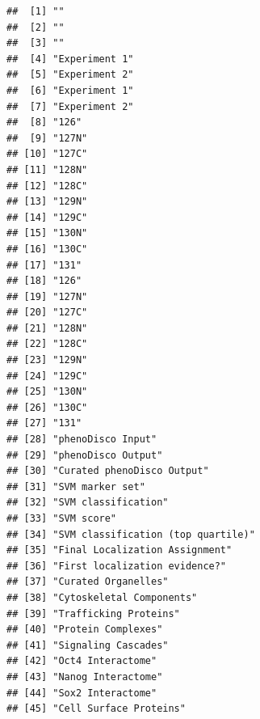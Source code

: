 \begin{knitrout}
\color{fgcolor}\begin{kframe}
\begin{alltt}
  \hlstd{=} \hlstd{,}  \hlstd{=} \hlstd{)}
\end{alltt}
\begin{verbatim}
##  [1] ""                                 
##  [2] ""                                 
##  [3] ""                                 
##  [4] "Experiment 1"                     
##  [5] "Experiment 2"                     
##  [6] "Experiment 1"                     
##  [7] "Experiment 2"                     
##  [8] "126"                              
##  [9] "127N"                             
## [10] "127C"                             
## [11] "128N"                             
## [12] "128C"                             
## [13] "129N"                             
## [14] "129C"                             
## [15] "130N"                             
## [16] "130C"                             
## [17] "131"                              
## [18] "126"                              
## [19] "127N"                             
## [20] "127C"                             
## [21] "128N"                             
## [22] "128C"                             
## [23] "129N"                             
## [24] "129C"                             
## [25] "130N"                             
## [26] "130C"                             
## [27] "131"                              
## [28] "phenoDisco Input"                 
## [29] "phenoDisco Output"                
## [30] "Curated phenoDisco Output"        
## [31] "SVM marker set"                   
## [32] "SVM classification"               
## [33] "SVM score"                        
## [34] "SVM classification (top quartile)"
## [35] "Final Localization Assignment"    
## [36] "First localization evidence?"     
## [37] "Curated Organelles"               
## [38] "Cytoskeletal Components"          
## [39] "Trafficking Proteins"             
## [40] "Protein Complexes"                
## [41] "Signaling Cascades"               
## [42] "Oct4 Interactome"                 
## [43] "Nanog Interactome"                
## [44] "Sox2 Interactome"                 
## [45] "Cell Surface Proteins"
\end{verbatim}
\end{kframe}
\end{knitrout}

